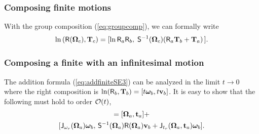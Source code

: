 \documentclass[journal]{IEEEtran}
\newcommand{\bfomega}{\boldsymbol{\omega}}
\newcommand{\bfOmega}{\boldsymbol{\Omega}}
\newcommand{\beq}{\begin{equation}}
\newcommand{\eeq}{\end{equation}}
\begin{document}
\subsubsection{Composing finite motions}
With the group composition (\ref{eq:groupcomp}), we can formally write
\beq
    \ln \, (\mathsf{R}(\bfOmega_c),{\bf T}_c) = [\ln \mathsf{R}_a\mathsf{R}_b,\;
    \mathsf{S}^{-1}(\bfOmega_c) (\mathsf{R}_a{\bf T}_b + {\bf T}_a) \, ].
    \label{eq:addfiniteSE3}
\eeq

\subsubsection{Composing a finite with an infinitesimal motion}
The addition formula (\ref{eq:addfiniteSE3}) can be analyzed in the limit $t\rightarrow 0$ where the right composition is $\ln (\mathsf{R}_b,{\bf T}_b) = [t \bfomega_b, t {\bf v}_b]$. It is easy to show that the following must hold to order ${\cal O}(t)$,
\begin{multline}
    [\bfOmega_c,{\bf t}_c] = [\bfOmega_a,{\bf t}_a] + \\
    [\mathsf{J}_{\omega_r}(\bfOmega_a)\bfomega_b,\, 
    \mathsf{S}^{-1}(\bfOmega_a)\mathsf{R}(\bfOmega_a){\bf v}_b + \mathsf{J}_{t_r}(\bfOmega_a,{\bf t}_a)\bfomega_b].
    \label{eq:SE3vectoraddition}
\end{multline}
\end{document}
